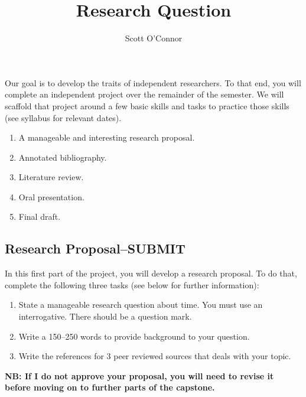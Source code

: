 \documentclass[]{article}
\title{Research Question}
\author{Scott O’Connor}
\providecommand{\tightlist}{%
  \setlength{\itemsep}{0pt}\setlength{\parskip}{0pt}}
\begin{document}


Our goal is to develop the traits of independent researchers. To that
end, you will complete an independent project over the remainder of the
semester. We will scaffold that project around a few basic skills and
tasks to practice those skills (see syllabus for relevant dates).

\begin{enumerate}
\def\labelenumi{\arabic{enumi}.}
\tightlist
\item
  A manageable and interesting research proposal.
\item
  Annotated bibliography.
\item
  Literature review.
\item
  Oral presentation.
\item
  Final draft.
\end{enumerate}


\hypertarget{research-proposalsubmit}{%
\subsection{Research Proposal--SUBMIT}\label{research-proposalsubmit}}

In this first part of the project, you will develop a research proposal.
To do that, complete the following three tasks (see below for further information):

\begin{enumerate}
\def\labelenumi{\arabic{enumi}.}
\tightlist
\item
  State a manageable research question about time. You must use an
  interrogative. There should be a question mark.
\item
  Write a 150--250 words to provide background to your question.
\item
  Write the references for 3 peer reviewed sources that deals with your
  topic.
\end{enumerate}

\textbf{NB: If I do not approve your proposal, you will need to revise
it before moving on to further parts of the capstone.}
\end{document}
